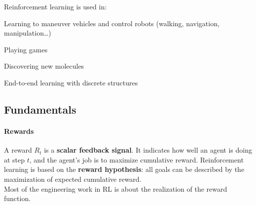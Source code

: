 \documentclass[10pt]{report}
\begin{document}
Reinforcement learning is used in:
\begin{list}{}{}
	\item Learning to maneuver vehicles and control robots (walking, navigation, manipulation\ldots)
	\item Playing games
	\item Discovering new molecules
	\item End-to-end learning with discrete structures
\end{list}
\subsection{Fundamentals}
\paragraph{Rewards} A reward $R_t$ is a \textbf{scalar feedback signal}. It indicates how well an agent is doing at step $t$, and the agent's job is to maximize cumulative reward. Reinforcement learning is based on the \textbf{reward hypothesis}: all goals can be described by the maximization of expected cumulative reward.\\
Most of the engineering work in RL is about the realization of the reward function.
\end{document}
